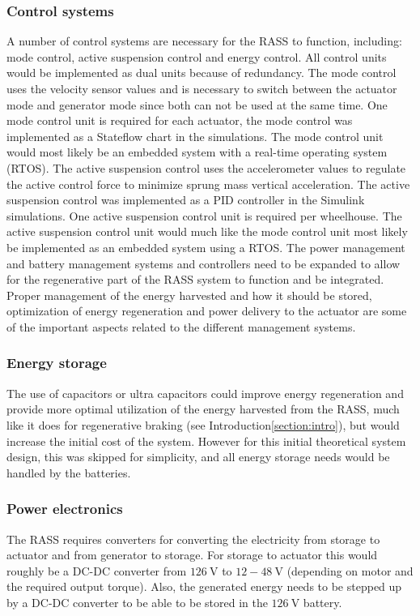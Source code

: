 \subsubsection{Control systems}
A number of control systems are necessary for the RASS to function, including: mode control, active suspension control and energy control. All control units would be implemented as dual units because of redundancy. 
The mode control uses the velocity sensor values and is necessary to switch between the actuator mode and generator mode since both can not be used at the same time. One mode control unit is required for each actuator, the mode control was implemented as a Stateflow chart in the simulations. The mode control unit would most likely be an embedded system with a real-time operating system (RTOS).
The active suspension control uses the accelerometer values to regulate the active control force to minimize sprung mass vertical acceleration. The active suspension control was implemented as a PID controller in the Simulink simulations. One active suspension control unit is required per wheelhouse. The active suspension control unit would much like the mode control unit most likely be implemented as an embedded system using a RTOS.
The power management and battery management systems and controllers need to be expanded to allow for the regenerative part of the RASS system to function and be integrated. Proper management of the energy harvested and how it should be stored, optimization of energy regeneration and power delivery to the actuator are some of the important aspects related to the different management systems.

\subsubsection{Energy storage}
The use of capacitors or ultra capacitors could improve energy regeneration and provide more optimal utilization of the energy harvested from the RASS, much like it does for regenerative braking (see Introduction\:\ref{section:intro}), but would increase the initial cost of the system. However for this initial theoretical system design, this was skipped for simplicity, and all energy storage needs would be handled by the batteries.


\subsubsection{Power electronics}
The RASS requires converters for converting the electricity from storage to actuator and from generator to storage.
For storage to actuator this would roughly be a DC-DC converter from $126\:\text{V}$\:\cite{mdhsolarteamBillMaterials} to $12-48\:\text{V}$ (depending on motor and the required output torque).
Also, the generated energy needs to be stepped up by a DC-DC converter to be able to be stored in the $126\:\text{V}$ battery\:\cite{mdhsolarteamBillMaterials}.

